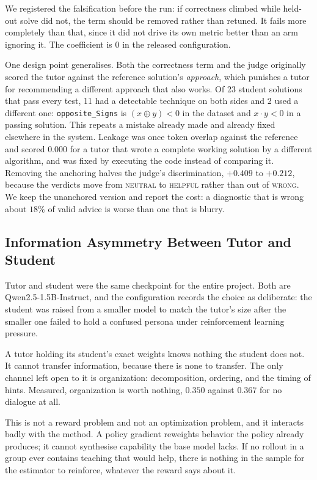 \documentclass[conference]{IEEEtran}
\begin{document}
We registered the falsification before the run: if correctness climbed while
held-out solve did not, the term should be removed rather than retuned. It
fails more completely than that, since it did not drive its own metric better
than an arm ignoring it. The coefficient is $0$ in the released configuration.

One design point generalises. Both the correctness term and the judge
originally scored the tutor against the reference solution's \emph{approach},
which punishes a tutor for recommending a different approach that also works.
Of 23 student solutions that pass every test, 11 had a detectable technique on
both sides and 2 used a different one: \texttt{opposite\_Signs} is
$(x \oplus y) < 0$ in the dataset and $x \cdot y < 0$ in a passing solution.
This repeats a mistake already made and already fixed elsewhere in the
system. Leakage was once token overlap against the reference and scored
$0.000$ for a tutor that wrote a complete working solution by a different
algorithm, and was fixed by executing the code instead of comparing it.
Removing the anchoring halves the judge's discrimination, $+0.409$ to $+0.212$,
because the verdicts move from \textsc{neutral} to \textsc{helpful} rather than
out of \textsc{wrong}. We keep the unanchored version and report the cost: a
diagnostic that is wrong about $18\%$ of valid advice is worse than one that is
blurry.

\subsection{Information Asymmetry Between Tutor and Student}
\label{sec:asymmetry}

Tutor and student were the same checkpoint for the entire project. Both are
Qwen2.5-1.5B-Instruct, and the configuration records the choice as deliberate:
the student was raised from a smaller model to match the tutor's size after the
smaller one failed to hold a confused persona under reinforcement learning
pressure.

A tutor holding its student's exact weights knows nothing the student does not.
It cannot transfer information, because there is none to transfer. The only
channel left open to it is organization: decomposition, ordering, and the
timing of hints. Measured, organization is worth nothing, $0.350$ against
$0.367$ for no dialogue at all.

This is not a reward problem and not an optimization problem, and it interacts
badly with the method. A policy gradient reweights behavior the policy already
produces; it cannot synthesise capability the base model lacks. If no rollout
in a group ever contains teaching that would help, there is nothing in the
sample for the estimator to reinforce, whatever the reward says about it.
\end{document}
